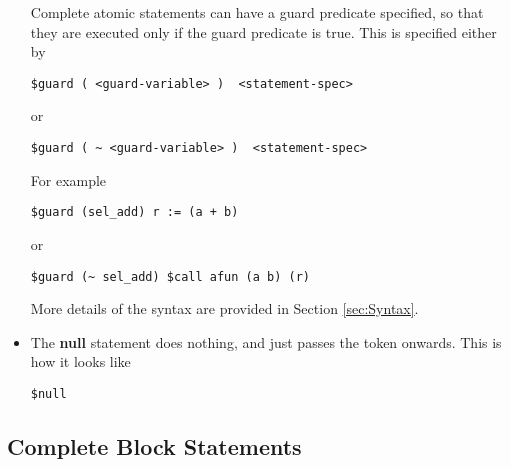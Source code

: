 \documentclass{article}
\begin{document}
\begin{itemize}
Complete atomic statements can have a guard predicate
specified, so that they are executed only if the guard
predicate is true.  This is specified either by
\begin{verbatim}
$guard ( <guard-variable> )  <statement-spec>
\end{verbatim}
or 
\begin{verbatim}
$guard ( ~ <guard-variable> )  <statement-spec>
\end{verbatim}
For example
\begin{verbatim}
$guard (sel_add) r := (a + b)
\end{verbatim}
or
\begin{verbatim}
$guard (~ sel_add) $call afun (a b) (r)
\end{verbatim}


More details of the syntax are provided in 
Section \ref{sec:Syntax}.

\item The {\bf null} statement does nothing, and just passes the
token onwards.  This is how it looks like
\begin{verbatim}
$null
\end{verbatim}
\end{itemize}

\subsection{Complete Block Statements}
\end{document}
